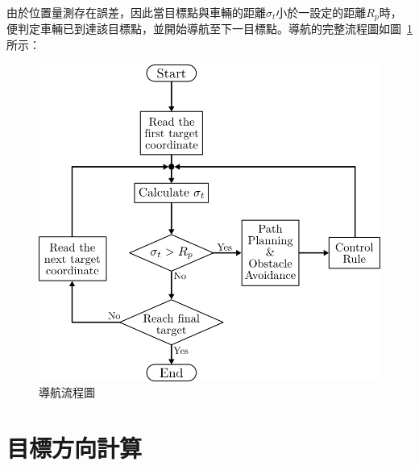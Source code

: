 由於位置量測存在誤差，因此當目標點與車輛的距離$\sigma_t$小於一設定的距離$R_p$時，
便判定車輛已到達該目標點，並開始導航至下一目標點。導航的完整流程圖如圖~\ref{f:navigation_flow}所示：
\begin{figure}[h!]
	\centering
	\includegraphics[width=\textwidth]{figures/algorithm/navigation_flow}
	\caption{導航流程圖}
	\label{f:navigation_flow}
\end{figure}

\section{目標方向計算}
\label{sec:target}

